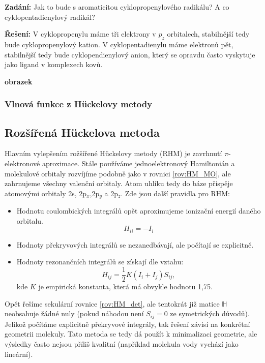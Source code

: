 \begin{priklad}
\textbf{Zadání:} Jak to bude s aromaticitou cyklopropenylového radikálu? A co cyklopentadienylový radikál?

\textbf{Řešení:} V cyklopropenylu máme tři elektrony v $p_z$ orbitalech, stabilnější tedy bude cyklopropenylový kation. V cyklopentadienylu máme elektronů pět, stabilnější tedy bude cyklopendienylový anion, který se opravdu často vyskytuje jako ligand v komplexech kovů.
\end{priklad}

\textbf{obrazek}
\bigskip

\subsubsection{Vlnová funkce z H\"uckelovy metody}


\subsection{Rozšířená H\"{u}ckelova metoda}

Hlavním vylepšením rožšířené H\"{u}ckelovy metody (RHM) je zavrhnutí $\pi$-elektronové aproximace.
Stále používáme jednoelektronový Hamiltonián a molekulové orbitaly rozvíjíme podobně jako v rovnici \eqref{rov:HM_MO}, ale zahrnujeme všechny valenční orbitaly. Atom uhlíku tedy do báze přispěje atomovými orbitaly 2s, 2p$_x$,2p$_y$ a 2p$_z$. 
Zde jsou další pravidla pro RHM:

\begin{itemize}
\item Hodnotu coulombických integrálů opět aproximujeme ionizační energií daného orbitalu.
$$H_{ii}=-I_i$$
\item Hodnoty překryvových integrálů se nezanedbávají, ale počítají se explicitně.
\item Hodnoty rezonančních integrálů se získají dle vztahu:
\begin{equation}
H_{ij}=\frac{1}{2}K(I_i+I_j)S_{ij},
\end{equation}
kde $K$ je empirická konstanta, která má obvykle hodnotu 1,75.
\end{itemize}
Opět řešíme sekulární rovnice \eqref{rov:HM_det}, ale tentokrát již matice $\mathbb{H}$ neobsahuje žádné nuly (pokud náhodou není $S_{ij}=0$ ze symetrických důvodů). Jelikož počítáme explicitně překryvové integrály, tak řešení závisí na konkrétní geometrii molekuly. Tato metoda se tedy dá použít k minimalizaci geometrie, ale výsledky často nejsou příliš kvalitní (například molekula vody vychází jako lineární).

